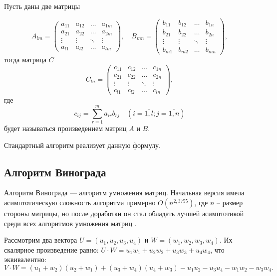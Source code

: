 Пусть даны две матрицы

\begin{equation}
	A_{lm} = \begin{pmatrix}
		a_{11} & a_{12} & \ldots & a_{1m}\\
		a_{21} & a_{22} & \ldots & a_{2m}\\
		\vdots & \vdots & \ddots & \vdots\\
		a_{l1} & a_{l2} & \ldots & a_{lm}
	\end{pmatrix},
	\quad
	B_{mn} = \begin{pmatrix}
		b_{11} & b_{12} & \ldots & b_{1n}\\
		b_{21} & b_{22} & \ldots & b_{2n}\\
		\vdots & \vdots & \ddots & \vdots\\
		b_{m1} & b_{m2} & \ldots & b_{mn}
	\end{pmatrix},
\end{equation}
тогда матрица $C$
\begin{equation}
	C_{ln} = \begin{pmatrix}
		c_{11} & c_{12} & \ldots & c_{1n}\\
		c_{21} & c_{22} & \ldots & c_{2n}\\
		\vdots & \vdots & \ddots & \vdots\\
		c_{l1} & c_{l2} & \ldots & c_{ln}
	\end{pmatrix},
\end{equation}
где
\begin{equation}
	\label{eq:M}
	c_{ij} =
	\sum_{r=1}^{m} a_{ir}b_{rj} \quad (i=\overline{1,l}; j=\overline{1,n})
\end{equation}
будет называться произведением матриц $A$ и $B$.

Стандартный алгоритм  реализует данную формулу.


\subsection{Алгоритм Винограда}

Алгоритм Винограда --- алгоритм умножения матриц. Начальная версия имела асимптотическую сложность алгоритма примерно $O(n^{2,3755})$, где $n$ -- размер стороны матрицы, но после доработки он стал обладать лучшей асимптотикой среди всех алгоритмов умножения матриц \cite{CoppersmithWinograd}.

Рассмотрим два вектора $U = (u_1, u_2, u_3, u_4)$ и $W = (w_1, w_2, w_3, w_4)$.
Их скалярное произведение равно: $U \cdot W = u_1w_1 + u_2w_2 + u_3w_3 + u_4w_4$, что эквивалентно: %
\newpage
\begin{equation}
	\label{for:new}
	V \cdot W = (u_1 + w_2)(u_2 + w_1) + (u_3 + w_4)(u_4 + w_3) - u_1u_2 - u_3u_4 - w_1w_2 - w_3w_4.
\end{equation}


